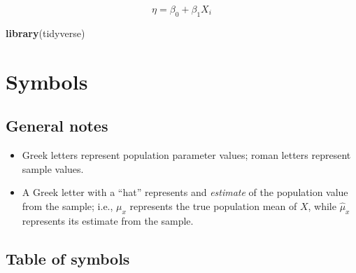 \documentclass[]{book}
\newenvironment{Shaded}{\begin{snugshade}}{\end{snugshade}}
\newcommand{\KeywordTok}[1]{\textcolor[rgb]{0.13,0.29,0.53}{\textbf{#1}}}
\newcommand{\NormalTok}[1]{#1}
\begin{document}
\[\eta = \beta_0 + \beta_1 X_i\]

\begin{Shaded}
\begin{Highlighting}[]
\KeywordTok{library}\NormalTok{(tidyverse)}
\end{Highlighting}
\end{Shaded}

\hypertarget{appendix-appendix}{%
\appendix}


\hypertarget{symbols}{%
\chapter{Symbols}\label{symbols}}

\hypertarget{general-notes}{%
\section{General notes}\label{general-notes}}

\begin{itemize}
\item
  Greek letters represent population parameter values; roman letters represent sample values.
\item
  A Greek letter with a ``hat'' represents and \emph{estimate} of the population value from the sample; i.e., \(\mu_x\) represents the true population mean of \(X\), while \(\hat{\mu}_x\) represents its estimate from the sample.
\end{itemize}

\hypertarget{table-of-symbols}{%
\section{Table of symbols}\label{table-of-symbols}}
\end{document}
